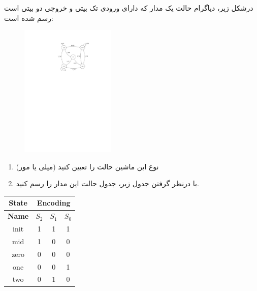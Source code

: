 

درشکل زیر، دیاگرام حالت یک مدار که دارای ورودی تک بیتی و خروجی دو بیتی است رسم شده است:

\begin{figure}[h]
	\centering
	\includegraphics[width=0.4\textwidth]{fig/Q_basic8_.pdf}
	\label{fig:Q_basic_8}
\end{figure}

\begin{enumerate}
	\item 
	 نوع این ماشین حالت را تعیین کنید (میلی یا مور)
	 
	 \item 
	 با درنظر گرفتن جدول زیر، جدول حالت این مدار را رسم کنید.
\end{enumerate}


\begin{latin}
	\begin{table}[h!]
		\centering
		\begin{tabular}{|c|c|c|c|}
			\hline
			\textbf{State} & \multicolumn{3}{|c|}{\textbf{Encoding}} \\ \hline
			\textbf{Name} & $S_2$ & $S_1$ & $S_0$ \\ \hline
			init          & 1     & 1     & 1     \\ \hline
			mid           & 1     & 0     & 0     \\ \hline
			zero          & 0     & 0     & 0     \\ \hline
			one           & 0     & 0     & 1     \\ \hline
			two           & 0     & 1     & 0     \\ \hline
		\end{tabular}
	\end{table}
\end{latin}


